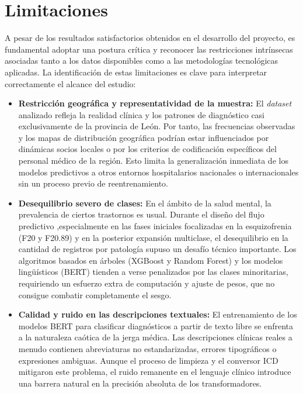 \documentclass[12pt,a4paper,onecolumn,oneside]{report}
\begin{document}
\section{Limitaciones}

A pesar de los resultados satisfactorios obtenidos en el desarrollo del proyecto, es fundamental adoptar una postura crítica y reconocer las restricciones intrínsecas asociadas tanto a los datos disponibles como a las metodologías tecnológicas aplicadas. La identificación de estas limitaciones es clave para interpretar correctamente el alcance del estudio:

\begin{itemize}
    \item \textbf{Restricción geográfica y representatividad de la muestra:} El \textit{dataset} analizado refleja la realidad clínica y los patrones de diagnóstico casi exclusivamente de la provincia de León. Por tanto, las frecuencias observadas y los mapas de distribución geográfica podrían estar influenciados por dinámicas socios locales o por los criterios de codificación específicos del personal médico de la región. Esto limita la generalización inmediata de los modelos predictivos a otros entornos hospitalarios nacionales o internacionales sin un proceso previo de reentrenamiento.
    
    \item \textbf{Desequilibrio severo de clases:} En el ámbito de la salud mental, la prevalencia de ciertos trastornos es usual. Durante el diseño del flujo predictivo ,especialmente en las fases iniciales focalizadas en la esquizofrenia (F20 y F20.89) y en la posterior expansión multiclase, el desequilibrio en la cantidad de registros por patología supuso un desafío técnico importante. Los algoritmos basados en árboles (XGBoost y Random Forest) y los modelos lingüísticos (BERT) tienden a verse penalizados por las clases minoritarias, requiriendo un esfuerzo extra de computación y ajuste de pesos, que no consigue combatir completamente el sesgo.
    
    \item \textbf{Calidad y ruido en las descripciones textuales:} El entrenamiento de los modelos BERT para clasificar diagnósticos a partir de texto libre se enfrenta a la naturaleza caótica de la jerga médica. Las descripciones clínicas reales a menudo contienen abreviaturas no estandarizadas, errores tipográficos o expresiones ambiguas. Aunque el proceso de limpieza y el conversor ICD mitigaron este problema, el ruido remanente en el lenguaje clínico introduce una barrera natural en la precisión absoluta de los transformadores.
    

\end{itemize}
\end{document}
